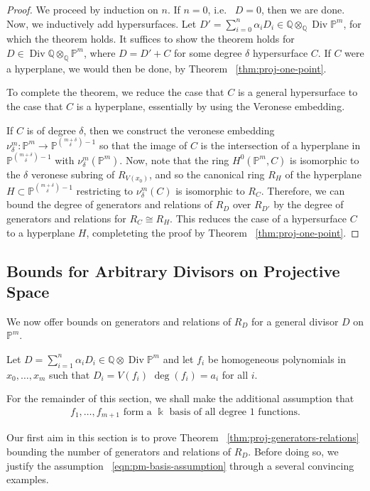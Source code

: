\documentclass{amsart}
\theoremstyle{plain}
\theoremstyle{definition}
\theoremstyle{remark}
\numberwithin{equation}{section}
\newcommand\ssec{\subsection}
\newcommand\bq{{\mathbb Q}}
\newcommand\bp{{\mathbb P}}
\newcommand\bk{{\Bbbk}}
\DeclareMathOperator\di{Div}
\newcommand\pdeg{\delta}
\begin{document}
\begin{proof}
We proceed by induction on $n$.
If $n = 0$, i.e.~ $D = 0$, then we are done.
Now, we inductively add hypersurfaces.
Let $D' = \sum_{i = 0}^{n} \alpha_i D_i \in \bq \otimes_\bq\di \bp^m$, 
for which the theorem holds. It suffices to show
the theorem holds for $D \in \di \bq \otimes_\bq \bp^m$, where $D = D' + C$ for some
degree $\pdeg$ hypersurface $C$.
If $C$ were a hyperplane, we would then be done, by Theorem ~\ref{thm:proj-one-point}.

To complete the theorem, we reduce the case that $C$ is a general hypersurface
to the case that $C$ is a hyperplane, essentially by using the Veronese embedding.

If $C$ is of degree $\pdeg$, then we construct the veronese embedding
$\nu_\pdeg^m: \bp^m \rightarrow \bp^{\binom{m+\pdeg}{\pdeg}-1}$
so that the image of $C$ is the intersection of 
a hyperplane in $\bp^{\binom{{m + \pdeg}}{\pdeg} - 1}$ with $\nu_\pdeg^m(\bp^m)$.
Now, note that the ring $H^0(\bp^m, C)$ is isomorphic to the
$\pdeg$ veronese subring of $R_{V(x_0)}$, and so
the canonical ring $R_H$ of the hyperplane $H \subset \bp^{\binom{m+\pdeg}{\pdeg}-1}$
restricting to $\nu_\pdeg^m(C)$ is isomorphic to $R_C$.
Therefore, we can bound the degree of generators and relations of
$R_D$ over $R_{D'}$ by the degree of generators and
relations for $R_C \cong R_H.$
This reduces the case of a hypersurface $C$ to
a hyperplane $H$, completeting the proof by Theorem
~\ref{thm:proj-one-point}.
\end{proof}


\ssec{Bounds for Arbitrary Divisors on Projective Space}


We now offer bounds on generators and relations of $R_D$ for a general divisor $D$ on $\bp^m$.

Let $D = \sum_{i=1}^n \alpha_i D_i \in \bq \otimes \di \bp^m$ and let $f_i$ be
homogeneous polynomials in $x_0, \ldots, x_m$ such that $D_i = V(f_i)$
$\deg(f_i) = a_i$ for all $i$. 

For the remainder of this section, we shall make the additional assumption that 
\begin{align}
\label{eqn:pm-basis-assumption}
	f_1, \ldots, f_{m+1} \text{ form a } \bk \text{ basis of all degree 1 functions.}
\end{align}

Our first aim in this section is to prove Theorem
~\ref{thm:proj-generators-relations} bounding the number of generators and
relations of $R_D$. Before doing so, we justify the assumption
~\eqref{eqn:pm-basis-assumption} through a several convincing examples.
\end{document}
